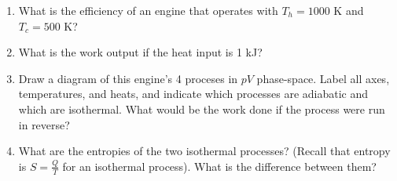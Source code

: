 \documentclass[10pt]{article}
\begin{document}
\begin{enumerate}
\begin{enumerate}
\item What is the efficiency of an engine that operates with $T_h = 1000$ K and $T_c = 500$ K? \\ \vspace{2cm}
\item What is the work output if the heat input is 1 kJ? \\ \vspace{2cm}
\item Draw a diagram of this engine's 4 proceses in $pV$ phase-space.  Label all axes, temperatures, and heats, and indicate which processes are adiabatic and which are isothermal. What would be the work done if the process were run in reverse? \\ \vspace{4cm}
\item What are the entropies of the two isothermal processes? (Recall that entropy is $S = \frac{Q}{T}$ for an isothermal process).  What is the difference between them?
\end{enumerate}
\end{enumerate}
\end{document}
